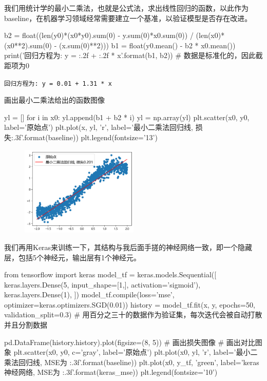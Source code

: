 \documentclass[a5paper, 11pt, openany]{book}
\begin{document}
我们用统计学的最小二乘法，也就是公式法，求出线性回归的函数，以此作为baseline，在机器学习领域经常需要建立一个基准，以验证模型是否存在改进。

\begin{python}
b2 = float((len(y0)*(x0*y0).sum(0) - y.sum(0)*x0.sum(0)) /
           (len(x0)*(x0**2).sum(0) - (x.sum(0)**2)))
b1 = float(y0.mean() - b2 * x0.mean())
print('回归方程为: y = {:.2f} + {:.2f} * x'.format(b1, b2))
# 数据是标准化的，因此截距项为0
\end{python}
\verb|回归方程为: y = 0.01 + 1.31 * x|

画出最小二乘法给出的函数图像
\begin{python}
yl = []
for i in x0:
    yl.append(b1 + b2 * i)
yl = np.array(yl)
plt.scatter(x0, y0, label='原始点')
plt.plot(x, yl, 'r', label='最小二乘法回归线, 损失{:.3f}'.format(baseline))
plt.legend(fontsize='13')
\end{python}

\begin{figure}[h]
    \centering
    \includegraphics[width=0.5\textwidth]{figures/最小二乘法图像.png}
\end{figure}

我们再用Keras来训练一下，其结构与我后面手搓的神经网络一致，即一个隐藏层，包括5个神经元，输出层有1个神经元。

\begin{python}
from tensorflow import keras
model_tf = keras.models.Sequential([ 
    keras.layers.Dense(5, input_shape=[1,], activation='sigmoid'),
    keras.layers.Dense(1),
])
model_tf.compile(loss='mse', optimizer=keras.optimizers.SGD(0.01))
history = model_tf.fit(x, y, epochs=50, validation_split=0.3)
# 用百分之三十的数据作为验证集，每次迭代会被自动打散并且分割数据

pd.DataFrame(history.history).plot(figsize=(8, 5)) # 画出损失图像
# 画出对比图象
plt.scatter(x0, y0, c='gray', label='原始点')
plt.plot(x0, yl, 'r', label='最小二乘法回归线, MSE为 {:.3f}'.format(baseline))
plt.plot(x0, y_tf, 'green', label='keras神经网络, MSE为 {:.3f}'.format(keras_mse))
plt.legend(fontsize='10')
\end{python}
\end{document}
